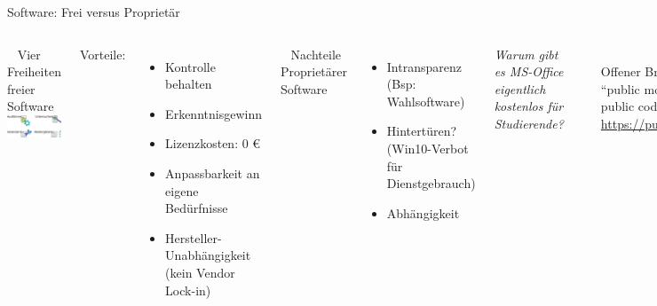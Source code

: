 \documentclass[t]{beamer}
\begin{document}
\begin{frame}[label=wb]{\color{fg}Software: Frei versus Proprietär}

\begin{columns}


~
Vier Freiheiten freier Software\\[4mm]
\includegraphics[width=40mm]{img-src/vier-freiheiten}
\pause

Vorteile:
\begin{itemize}
\item Kontrolle behalten
\item Erkenntnisgewinn
\item Lizenzkosten: 0 €
\item Anpassbarkeit an eigene Bedürfnisse
\item Hersteller-Unabhängigkeit\\[-2mm] {\tiny (kein Vendor Lock-in)}

\end{itemize}


~
Nachteile Proprietärer Software
\begin{itemize}
 \item Intransparenz {\tiny (Bsp: Wahlsoftware)}
 \item Hintertüren? {\tiny (Win10-Verbot für Dienstgebrauch)}
 \item Abhängigkeit
\end{itemize}
 \pause
 \bigskip


 \textit{Warum gibt es MS-Office eigentlich { kostenlos} für Studierende?}

 \pause
 \pause
 \medskip
 \rule{\textwidth}{1pt}\\[2mm]
 Offener Brief:\\

 "`public money $\Rightarrow$ public code"'\\[2mm]

 \url{https://publiccode.eu}


\end{columns}

\end{frame}
\end{document}
